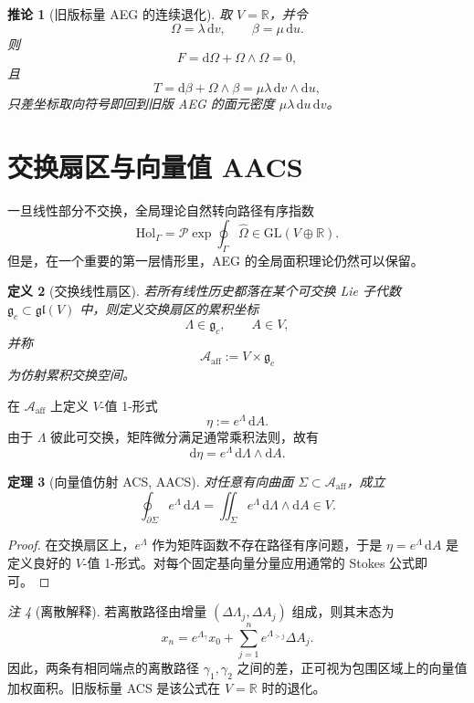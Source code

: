 \documentclass[11pt,a4paper]{ctexart}
\newtheorem{definition}{定义}[section]
\newtheorem{theorem}[definition]{定理}
\newtheorem{corollary}[definition]{推论}
\theoremstyle{remark}
\newtheorem{remark}[definition]{注}
\newcommand{\GL}{\mathrm{GL}}
\newcommand{\Hol}{\mathrm{Hol}}
\newcommand{\R}{\mathbb{R}}
\newcommand{\dd}{\mathrm{d}}
\begin{document}
\begin{corollary}[旧版标量 AEG 的连续退化]
取 $V=\R$，并令
\[
\Omega=\lambda\,\dd v,
\qquad
\beta=\mu\,\dd u.
\]
则
\[
F=\dd\Omega+\Omega\wedge\Omega=0,
\]
且
\[
T=\dd\beta+\Omega\wedge\beta
=\mu\lambda\,\dd v\wedge\dd u,
\]
只差坐标取向符号即回到旧版 AEG 的面元密度 $\mu\lambda\,\dd u\,\dd v$。
\end{corollary}

\section{交换扇区与向量值 AACS}

一旦线性部分不交换，全局理论自然转向路径有序指数
\[
\Hol_{\Gamma}=\mathcal P\exp\oint_{\Gamma}\widehat\Omega
\in\GL(V\oplus\R).
\]
但是，在一个重要的第一层情形里，AEG 的全局面积理论仍然可以保留。

\begin{definition}[交换线性扇区]
若所有线性历史都落在某个可交换 Lie 子代数 $\mathfrak g_c\subset\mathfrak{gl}(V)$ 中，则定义交换扇区的累积坐标
\[
\Lambda\in\mathfrak g_c,
\qquad
A\in V,
\]
并称
\[
\mathcal A_{\mathrm{aff}}:=V\times\mathfrak g_c
\]
为仿射累积交换空间。
\end{definition}

在 $\mathcal A_{\mathrm{aff}}$ 上定义 $V$-值 1-形式
\[
\eta:=e^{\Lambda}\,\dd A.
\]
由于 $\Lambda$ 彼此可交换，矩阵微分满足通常乘积法则，故有
\[
\dd\eta=e^{\Lambda}\,\dd\Lambda\wedge\dd A.
\]

\begin{theorem}[向量值仿射 ACS, AACS]
对任意有向曲面 $\Sigma\subset\mathcal A_{\mathrm{aff}}$，成立
\[
\oint_{\partial\Sigma}e^{\Lambda}\,\dd A
=
\iint_{\Sigma}e^{\Lambda}\,\dd\Lambda\wedge\dd A
\in V.
\]
\end{theorem}

\begin{proof}
在交换扇区上，$e^{\Lambda}$ 作为矩阵函数不存在路径有序问题，于是 $\eta=e^{\Lambda}\,\dd A$ 是定义良好的 $V$-值 1-形式。对每个固定基向量分量应用通常的 Stokes 公式即可。
\end{proof}

\begin{remark}[离散解释]
若离散路径由增量 $(\Delta\Lambda_j,\Delta A_j)$ 组成，则其末态为
\[
x_n=e^{\Lambda_\gamma}x_0+
\sum_{j=1}^n e^{\Lambda_{>j}}\Delta A_j.
\]
因此，两条有相同端点的离散路径 $\gamma_1,\gamma_2$ 之间的差，正可视为包围区域上的向量值加权面积。旧版标量 ACS 是该公式在 $V=\R$ 时的退化。
\end{remark}
\end{document}
